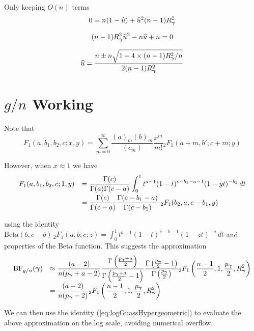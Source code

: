 \documentclass{article}[12pt]
\def\Beta{\mbox{Beta}}
\begin{document}
\noindent Only keeping $O(n)$ terms
$$
0
= n(1 - \widehat{u}) 
+ \widehat{u}^2 (n-1) R_{\boldsymbol \gamma}^2 
$$

$$
(n-1) R_{\boldsymbol \gamma}^2 \widehat{u}^2 - n\widehat{u} + n = 0
$$

$$
\widehat{u} = \frac{n \pm n\sqrt{1 - 4 \times (n-1) R_{\boldsymbol \gamma}^2 /n}}{2(n-1) R_{\boldsymbol \gamma}^2}
$$




\section{$g/n$ Working}

Note that
$$
F_1(a,b_1,b_2,c; x,y) = \sum_{m=0}^\infty \frac{(a)_m(b)_m}{(c_m)}\frac{x^m}{m!} {}_2 F_1(a+m,b';c+m;y)
$$


However, when $x\approx 1$ we have
$$
\begin{array}{rl} 
F_1(a,b_1,b_2,c; 1,y) 
& \displaystyle = \frac{\Gamma(c)} {\Gamma(a)\Gamma(c-a)} 
\int_0^1 t^{a-1} (1-t)^{c-b_1-a-1} (1-yt)^{-b_2} \, dt
\\ [2ex]
& \displaystyle 
= \frac{\Gamma(c)} {\Gamma(c-a)} 
\frac{\Gamma(c - b_1 - a)}{\Gamma(c - b_1)}
\frac{}{} 
{}_2  F_1(b_2, a, c - b_1, y)
\end{array} 
$$

\noindent using the identity
$\Beta(b,c-b) \,_2F_1(a,b;c;z) = \int_0^1 t^{b-1} (1-t)^{c-b-1}(1-zt)^{-a} \, dt$ and properties
of the Beta function. This suggests the approximation
$$
\begin{array}{rl} 
\displaystyle \mbox{BF}_{g/n}({\boldsymbol \gamma}) 
& \displaystyle \approx  
\frac{(a - 2)}{n(p_{\boldsymbol \gamma} + a - 2)} 
\frac{\Gamma\left( \tfrac{p_{\boldsymbol \gamma} + a}{2} \right)} {\Gamma\left( \tfrac{p_{\boldsymbol \gamma} + a}{2} - 1 \right)} 
\frac{\Gamma\left( \tfrac{p_{\boldsymbol \gamma}}{2}  - 1 \right)}{\Gamma\left(\frac{p_{\boldsymbol \gamma} }{2} \right)}
{}_2  F_1\left( \frac{n-1}{2}, 1, \frac{p_{\boldsymbol \gamma} }{2}, R_{\boldsymbol \gamma}^2 \right)
\\
& \displaystyle  = \frac{(a - 2)}{n(p_{\boldsymbol \gamma} - 2)} 
{}_2  F_1\left( \frac{n-1}{2}, 1, \frac{p_{\boldsymbol \gamma} }{2}, R_{\boldsymbol \gamma}^2 \right)
\end{array} 
$$

\noindent We can then use
the identity (\ref{eq:logGuassHypergeometric}) 
to evaluate the above approximation
on the log scale, avoiding numerical overflow.
\end{document}
